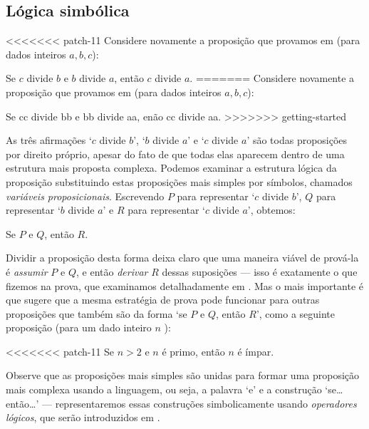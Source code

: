 \subsection*{Lógica simbólica}

<<<<<<< patch-11
Considere novamente a proposição que provamos em (para dados inteiros $a,b,c$):

\begin{center}
Se $c$ divide $b$ e $b$ divide $a$, então $c$ divide $a$.
=======
Considere novamente a proposição que provamos em  (para dados inteiros $a,b,c$):

\begin{center}
Se cc divide bb e bb divide aa, enão cc divide aa.
>>>>>>> getting-started
\end{center}

As três afirmações `$c$ divide $b$', `$b$ divide $a$' e `$c$ divide $a$' são todas proposições por direito próprio, apesar do fato de que todas elas aparecem dentro de uma estrutura mais proposta complexa. Podemos examinar a estrutura lógica da proposição substituindo estas proposições mais simples por símbolos, chamados \textit{variáveis ​​proposicionais}. Escrevendo $P$ para representar `$c$ divide $b$', $Q$ para representar `$b$ divide $a$' e $R$ para representar `$c$ divide $a$', obtemos:

\begin{center}
Se $P$ e $Q$, então $R$.
\end{center}

Dividir a proposição desta forma deixa claro que uma maneira viável de prová-la é \textit{assumir} $P$ e $Q$, e então \textit{derivar} $R$ dessas suposições --- isso é exatamente o que fizemos na prova, que examinamos detalhadamente em . Mas o mais importante é que sugere que a mesma estratégia de prova pode funcionar para outras proposições que também são da forma `se $P$ e $Q$, então $R$', como a seguinte proposição (para um dado inteiro $n$ ):

\begin{center}
<<<<<<< patch-11
Se $n > 2$ e $n$ é primo, então $n$ é ímpar.
\end{center}

Observe que as proposições mais simples são unidas para formar uma proposição mais complexa usando a linguagem, ou seja, a palavra `e' e a construção `se\dots{} então\dots{}' --- representaremos essas construções simbolicamente usando \textit {operadores lógicos}, que serão introduzidos em .


\end{center}
